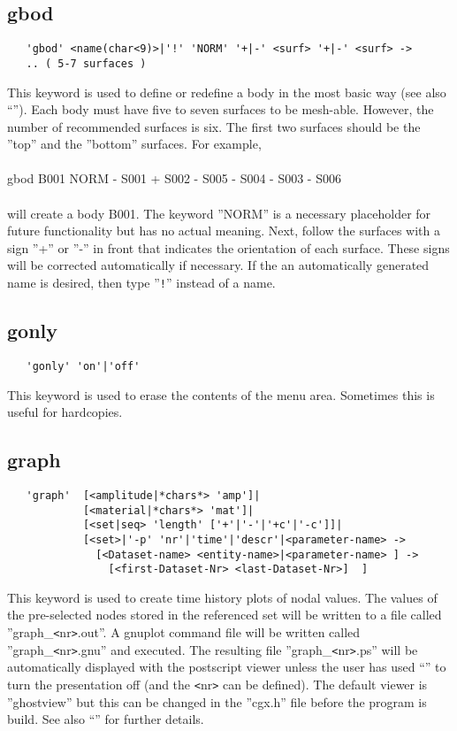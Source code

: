 \documentclass{article}
\begin{document}
\subsection{\label{gbod}gbod}
\begin{verbatim}
   'gbod' <name(char<9)>|'!' 'NORM' '+|-' <surf> '+|-' <surf> ->
   .. ( 5-7 surfaces )
\end{verbatim}
This keyword is used to define or redefine a body in the most basic way (see also ``''). Each body must have five to seven surfaces to be mesh-able. However, the number of recommended surfaces is six. The first two surfaces should be the ''top'' and the ''bottom'' surfaces. For example,\\\\gbod B001 NORM - S001 + S002 - S005 - S004 - S003 - S006\\\\will create a body B001. The keyword ''NORM'' is a necessary placeholder for future functionality but has no actual meaning. Next, follow the surfaces with a sign ''+'' or ''-'' in front that indicates the orientation of each surface. These signs will be corrected automatically if necessary. If the an automatically generated name is desired, then type ''\verb_!_'' instead of a name.

\subsection{\label{gonly}gonly}
\begin{verbatim}
   'gonly' 'on'|'off' 
\end{verbatim}
This keyword is used to erase the contents of the menu area. Sometimes this is useful for hardcopies.

\subsection{\label{graph}graph}
\begin{verbatim}
   'graph'  [<amplitude|*chars*> 'amp']|
            [<material|*chars*> 'mat']|
            [<set|seq> 'length' ['+'|'-'|'+c'|'-c']]| 
            [<set>|'-p' 'nr'|'time'|'descr'|<parameter-name> ->
              [<Dataset-name> <entity-name>|<parameter-name> ] ->
                [<first-Dataset-Nr> <last-Dataset-Nr>]  ]
\end{verbatim}
This keyword is used to create time history plots of nodal values. The values of the pre-selected nodes stored in the referenced set will be written to a file called ''graph\_\verb_<_nr\verb_>_.out''. A gnuplot command file will be written called ''graph\_\verb_<_nr\verb_>_.gnu'' and executed. The resulting file ''graph\_\verb_<_nr\verb_>_.ps'' will be automatically displayed with the postscript viewer unless the user has used ``'' to turn the presentation off (and the \verb_<_nr\verb_>_ can be defined). The default viewer is ''ghostview'' but this can be changed in the ''cgx.h'' file before the program is build. See also ``'' for further details.
\end{document}
